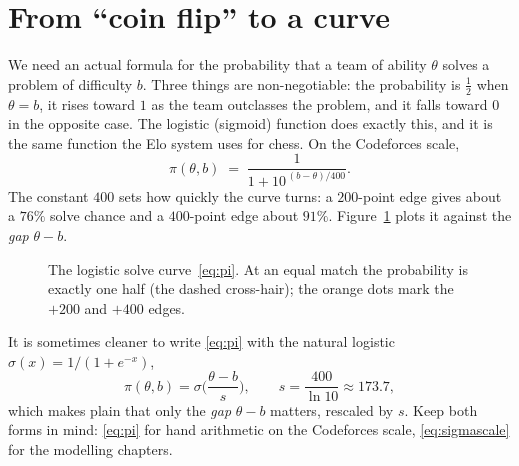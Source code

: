 \documentclass[11pt]{report}
\theoremstyle{definition}
\numberwithin{equation}{chapter}
\begin{document}
\section{From ``coin flip'' to a curve}

We need an actual formula for the probability that a team of ability $\theta$
solves a problem of difficulty $b$. Three things are non-negotiable: the
probability is $\tfrac12$ when $\theta=b$, it rises toward $1$ as the team
outclasses the problem, and it falls toward $0$ in the opposite case. The
logistic (sigmoid) function does exactly this, and it is the same function the
Elo system uses for chess. On the Codeforces scale,
\begin{equation}\label{eq:pi}
  \pi(\theta,b)\;=\;\frac{1}{1+10^{\,(b-\theta)/400}}.
\end{equation}
The constant $400$ sets how quickly the curve turns: a $200$-point edge gives
about a $76\%$ solve chance and a $400$-point edge about $91\%$. Figure~\ref{fig:sigmoid}
plots it against the \emph{gap} $\theta-b$.

\begin{figure}[h]
\centering
{}
\caption{The logistic solve curve~\eqref{eq:pi}. At an equal match the
probability is exactly one half (the dashed cross-hair); the orange dots mark the
$+200$ and $+400$ edges.}
\label{fig:sigmoid}
\end{figure}

It is sometimes cleaner to write \eqref{eq:pi} with the natural logistic
$\sigma(x)=1/(1+e^{-x})$,
\begin{equation}\label{eq:sigmascale}
  \pi(\theta,b)=\sigma\!\Big(\frac{\theta-b}{s}\Big),
  \qquad s=\frac{400}{\ln 10}\approx 173.7,
\end{equation}
which makes plain that only the \emph{gap} $\theta-b$ matters, rescaled by $s$.
Keep both forms in mind: \eqref{eq:pi} for hand arithmetic on the Codeforces
scale, \eqref{eq:sigmascale} for the modelling chapters.
\end{document}
